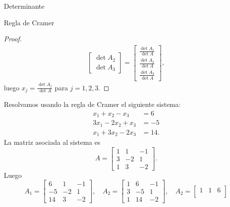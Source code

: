 \begin{chapter}{Determinante}
\begin{section}{Regla de Cramer}
\begin{proof}
\begin{align*}
\begin{bmatrix}
                     \det A_2 \\
                     \det A_3 \end{bmatrix} = \begin{bmatrix} \frac{\det A_1}{\det A}\\
                     \frac{\det A_2}{\det A} \\
                     \frac{\det A_3}{\det A}\end{bmatrix},
                     \end{align*}
                     luego $x_j = \displaystyle\frac{\det A_j}{\det A}$ para $j =1,2,3$.
                 \end{proof}
                 
                 \begin{ejemplo*}
                     Resolvamos usando la regla de Cramer el siguiente sistema:
                     \begin{align*}
                     x_1 + x_2 - x_3 &= 6 \\
                     3x_1 -2 x_2 + x_3 &= -5 \\ 
                     x_1 +3 x_2 - 2x_3 &= 14.
                     \end{align*}
                     La matriz asociada al sistema es 
                     $$
                     A= \begin{bmatrix}
                     1 &1  &-1 \\
                     3 &-2  &1 \\ 
                     1 &3 &-2
                     \end{bmatrix}.
                     $$
                     Luego 
                     $$
                     A_1 = \begin{bmatrix}
                     6 &1  &-1 \\
                     -5 &-2  &1 \\ 
                     14 &3 &-2
                     \end{bmatrix}, \quad
                     A_2 = \begin{bmatrix}
                     1 &6  &-1 \\
                     3 &-5  &1 \\ 
                     1 &14 &-2
                     \end{bmatrix}, \quad
                     A_2 = \begin{bmatrix}
                     1 &1  &6 \\

\end{bmatrix}$$
\end{ejemplo*}
\end{section}
\end{chapter}
